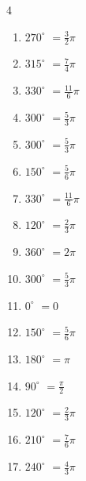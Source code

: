 \begin{multicols}{4}
\begin{enumerate}
  \item $\displaystyle 270^{\circ}$
        $\displaystyle =\frac{3}{2}\pi$

  \item $\displaystyle 315^{\circ}$
        $\displaystyle =\frac{7}{4}\pi$

  \item $\displaystyle 330^{\circ}$
        $\displaystyle =\frac{11}{6}\pi$

  \item $\displaystyle 300^{\circ}$
        $\displaystyle =\frac{5}{3}\pi$

  \item $\displaystyle 300^{\circ}$
        $\displaystyle =\frac{5}{3}\pi$

  \item $\displaystyle 150^{\circ}$
        $\displaystyle =\frac{5}{6}\pi$

  \item $\displaystyle 330^{\circ}$
        $\displaystyle =\frac{11}{6}\pi$

  \item $\displaystyle 120^{\circ}$
        $\displaystyle =\frac{2}{3}\pi$

  \item $\displaystyle 360^{\circ}$
        $\displaystyle =2\pi$

  \item $\displaystyle 300^{\circ}$
        $\displaystyle =\frac{5}{3}\pi$

  \item $\displaystyle 0^{\circ}$
        $\displaystyle =0$

  \item $\displaystyle 150^{\circ}$
        $\displaystyle =\frac{5}{6}\pi$

  \item $\displaystyle 180^{\circ}$
        $\displaystyle =\pi$

  \item $\displaystyle 90^{\circ}$
        $\displaystyle =\frac{\pi}{2}$

  \item $\displaystyle 120^{\circ}$
        $\displaystyle =\frac{2}{3}\pi$

  \item $\displaystyle 210^{\circ}$
        $\displaystyle =\frac{7}{6}\pi$

  \item $\displaystyle 240^{\circ}$
        $\displaystyle =\frac{4}{3}\pi$


\end{enumerate}
\end{multicols}

